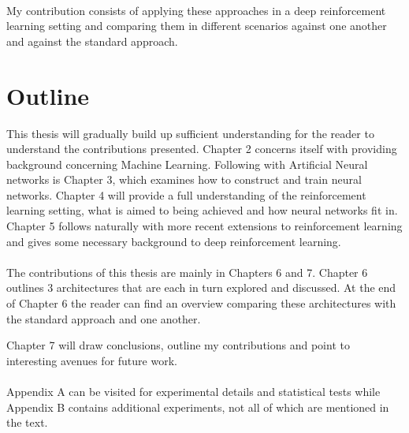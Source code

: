 \paragraph{}
My contribution consists
of applying these approaches
in a deep reinforcement learning setting
and comparing them in different scenarios
against one another and against the standard approach.

\section{Outline}
\label{sec:outline}
This thesis will gradually build up sufficient understanding
for the reader to understand the contributions presented.
Chapter 2 concerns itself with providing background
concerning Machine Learning.
Following with Artificial Neural networks is Chapter 3,
which examines how to construct and train neural networks.
Chapter 4 will provide a full understanding of
the reinforcement learning setting,
what is aimed to being achieved
and how neural networks fit in.
Chapter 5 follows naturally
with more recent extensions
to reinforcement learning
and gives some necessary background
to deep reinforcement learning.

\paragraph{}
The contributions of this thesis are mainly in Chapters 6 and 7.
Chapter 6 outlines 3 architectures
that are each in turn explored and discussed.
At the end of Chapter 6 the reader can find an overview
comparing these architectures with the standard approach
and one another.

Chapter 7 will draw conclusions,
outline my contributions
and point to
interesting avenues for
future work.

\paragraph{}
Appendix A can be visited for experimental details
and statistical tests
while Appendix B
contains additional experiments,
not all of which are mentioned in the text.
